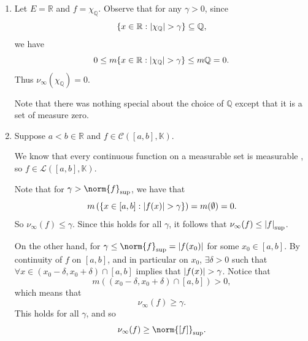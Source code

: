 \documentclass[notoc,notitlepage]{tufte-book}
\begin{document}
\begin{eg}\label{eg:continuous_functions_are_in_L_infty}
  \begin{enumerate}
    \item Let $E = \mathbb{R}$ and $f = \chi_{\mathbb{Q}}$. Observe that for any
      $\gamma > 0$, since
      \begin{equation*}
        \{ x \in \mathbb{R} : \left| \chi_{\mathbb{Q}} \right| > \gamma \} \subseteq
        \mathbb{Q},
      \end{equation*}
      we have
      \begin{equation*}
        0 \leq m \{ x \in \mathbb{R} : \left| \chi_{\mathbb{Q}} \right| > \gamma \}
        \leq m \mathbb{Q} = 0.
      \end{equation*}
      Thus $\nu_\infty(\chi_\mathbb{Q}) = 0$.

      Note that there was nothing special about the choice of $\mathbb{Q}$ 
      except that it is a set of measure zero.

    \item Suppose $a < b \in \mathbb{R}$ and $f \in \mathcal{C}([a, b] ,
      \mathbb{K})$.

    We know that every continuous function on a measurable set is
    measurable
    ,
    so $f \in \mathcal{L}([a, b], \mathbb{K})$.

    Note that for $\gamma > \norm{f}_{\sup}$, we have that
    \begin{equation*}
      m \left( \left\{ x \in [a, b] : \left|f(x)\right| > \gamma \right\} \right) =
      m(\emptyset) = 0.
    \end{equation*}
    So $\nu_\infty(f) \leq \gamma$. Since this holds for all $\gamma$, it
    follows that $\nu_\infty(f) \leq \left|f\right|_{\sup}$.

    On the other hand, for $\gamma \leq \norm{f}_{\sup} = \abs{f(x_0)}$ for some
    $x_0 \in [a, b]$. By continuity of $f$ on $[a, b]$, and in particular on
    $x_0$, $\exists \delta > 0$ such that $\forall x \in (x_0 - \delta, x_0 +
    \delta) \cap [a, b]$ implies that $\left|f(x)\right| > \gamma$. Notice that
    \begin{equation*}
      m \left( (x_0 - \delta, x_0 + \delta) \cap [a, b] \right) > 0,
    \end{equation*}
    which means that
    \begin{equation*}
      \nu_\infty(f) \geq \gamma.
    \end{equation*}
    This holds for all $\gamma$, and so
    \begin{equation*}
      \nu_\infty(f) \geq \norm{[f]}_{\sup}.
    \end{equation*}


\end{enumerate}
\end{eg}
\end{document}
